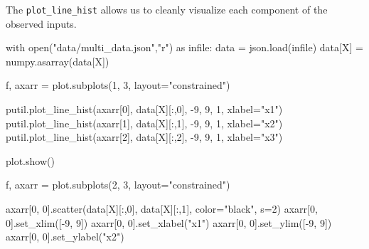 \documentclass[
  letterpaper,
  DIV=11,
  numbers=noendperiod]{scrartcl}
\newenvironment{Shaded}{\begin{snugshade}}{\end{snugshade}}
\newcommand{\BuiltInTok}[1]{\textcolor[rgb]{0.00,0.23,0.31}{#1}}
\newcommand{\ControlFlowTok}[1]{\textcolor[rgb]{0.00,0.23,0.31}{#1}}
\newcommand{\DecValTok}[1]{\textcolor[rgb]{0.68,0.00,0.00}{#1}}
\newcommand{\ImportTok}[1]{\textcolor[rgb]{0.00,0.46,0.62}{#1}}
\newcommand{\NormalTok}[1]{\textcolor[rgb]{0.00,0.23,0.31}{#1}}
\newcommand{\OperatorTok}[1]{\textcolor[rgb]{0.37,0.37,0.37}{#1}}
\newcommand{\StringTok}[1]{\textcolor[rgb]{0.13,0.47,0.30}{#1}}
\begin{document}
The \texttt{plot\_line\_hist} allows us to cleanly visualize each
component of the observed inputs.

\begin{Shaded}
\begin{Highlighting}[]
\ControlFlowTok{with} \BuiltInTok{open}\NormalTok{(}\StringTok{"data/multi\_data.json"}\NormalTok{,}\StringTok{"r"}\NormalTok{) }\ImportTok{as}\NormalTok{ infile:}
\NormalTok{  data }\OperatorTok{=}\NormalTok{ json.load(infile)}
\NormalTok{data[}\StringTok{\textquotesingle{}X\textquotesingle{}}\NormalTok{] }\OperatorTok{=}\NormalTok{ numpy.asarray(data[}\StringTok{\textquotesingle{}X\textquotesingle{}}\NormalTok{])}


\NormalTok{f, axarr }\OperatorTok{=}\NormalTok{ plot.subplots(}\DecValTok{1}\NormalTok{, }\DecValTok{3}\NormalTok{, layout}\OperatorTok{=}\StringTok{"constrained"}\NormalTok{)}

\NormalTok{putil.plot\_line\_hist(axarr[}\DecValTok{0}\NormalTok{], data[}\StringTok{\textquotesingle{}X\textquotesingle{}}\NormalTok{][:,}\DecValTok{0}\NormalTok{],}
                     \OperatorTok{{-}}\DecValTok{9}\NormalTok{, }\DecValTok{9}\NormalTok{, }\DecValTok{1}\NormalTok{, xlabel}\OperatorTok{=}\StringTok{"x1"}\NormalTok{)}
\NormalTok{putil.plot\_line\_hist(axarr[}\DecValTok{1}\NormalTok{], data[}\StringTok{\textquotesingle{}X\textquotesingle{}}\NormalTok{][:,}\DecValTok{1}\NormalTok{],}
                     \OperatorTok{{-}}\DecValTok{9}\NormalTok{, }\DecValTok{9}\NormalTok{, }\DecValTok{1}\NormalTok{, xlabel}\OperatorTok{=}\StringTok{"x2"}\NormalTok{)}
\NormalTok{putil.plot\_line\_hist(axarr[}\DecValTok{2}\NormalTok{], data[}\StringTok{\textquotesingle{}X\textquotesingle{}}\NormalTok{][:,}\DecValTok{2}\NormalTok{],}
                     \OperatorTok{{-}}\DecValTok{9}\NormalTok{, }\DecValTok{9}\NormalTok{, }\DecValTok{1}\NormalTok{, xlabel}\OperatorTok{=}\StringTok{"x3"}\NormalTok{)}

\NormalTok{plot.show()}

\NormalTok{f, axarr }\OperatorTok{=}\NormalTok{ plot.subplots(}\DecValTok{2}\NormalTok{, }\DecValTok{3}\NormalTok{, layout}\OperatorTok{=}\StringTok{"constrained"}\NormalTok{)}

\NormalTok{axarr[}\DecValTok{0}\NormalTok{, }\DecValTok{0}\NormalTok{].scatter(data[}\StringTok{\textquotesingle{}X\textquotesingle{}}\NormalTok{][:,}\DecValTok{0}\NormalTok{], data[}\StringTok{\textquotesingle{}X\textquotesingle{}}\NormalTok{][:,}\DecValTok{1}\NormalTok{],}
\NormalTok{                    color}\OperatorTok{=}\StringTok{"black"}\NormalTok{, s}\OperatorTok{=}\DecValTok{2}\NormalTok{)}
\NormalTok{axarr[}\DecValTok{0}\NormalTok{, }\DecValTok{0}\NormalTok{].set\_xlim([}\OperatorTok{{-}}\DecValTok{9}\NormalTok{, }\DecValTok{9}\NormalTok{])}
\NormalTok{axarr[}\DecValTok{0}\NormalTok{, }\DecValTok{0}\NormalTok{].set\_xlabel(}\StringTok{"x1"}\NormalTok{)}
\NormalTok{axarr[}\DecValTok{0}\NormalTok{, }\DecValTok{0}\NormalTok{].set\_ylim([}\OperatorTok{{-}}\DecValTok{9}\NormalTok{, }\DecValTok{9}\NormalTok{])}
\NormalTok{axarr[}\DecValTok{0}\NormalTok{, }\DecValTok{0}\NormalTok{].set\_ylabel(}\StringTok{"x2"}\NormalTok{)}


\end{Highlighting}
\end{Shaded}
\end{document}
